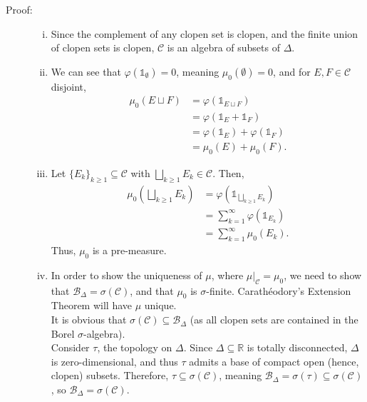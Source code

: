 \documentclass[10pt]{extarticle}
\newcommand{\R}{\mathbb{R}}
\begin{document}
  \begin{description}
    \item[Proof:]\hfill
      \begin{enumerate}[(i)]
        \item Since the complement of any clopen set is clopen, and the finite union of clopen sets is clopen, $\mathcal{C}$ is an algebra of subsets of $\Delta$.
        \item We can see that $\varphi(\mathbb{1}_{\emptyset}) = 0$, meaning $\mu_0(\emptyset) = 0$, and for $E,F\in \mathcal{C}$ disjoint,
          \begin{align*}
            \mu_0(E\sqcup F) &= \varphi(\mathbb{1}_{E\sqcup F})\\
                             &= \varphi(\mathbb{1}_{E} + \mathbb{1}_{F})\\
                             &= \varphi(\mathbb{1}_{E}) + \varphi(\mathbb{1}_{F})\\
                             &= \mu_0(E) + \mu_0(F).
          \end{align*}
        \item Let $\{E_k\}_{k\geq 1}\subseteq \mathcal{C}$ with $\bigsqcup_{k\geq 1}E_k \in \mathcal{C}$. Then,
          \begin{align*}
            \mu_0\left(\bigsqcup_{k\geq 1}E_k\right) &= \varphi\left(\mathbb{1}_{\bigsqcup_{k\geq 1}E_k}\right)\\
                                                     &= \sum_{k = 1}^{\infty}\varphi(\mathbb{1}_{E_k})\\
                                                     &= \sum_{k=1}^{\infty}\mu_0(E_k).
          \end{align*}
          Thus, $\mu_0$ is a pre-measure.
        \item In order to show the uniqueness of $\mu$, where $\mu|_{\mathcal{C}} = \mu_0$, we need to show that $\mathcal{B}_{\Delta} = \sigma(\mathcal{C})$, and that $\mu_0$ is $\sigma$-finite. Carathéodory's Extension Theorem will have $\mu$ unique.\\

          It is obvious that $\sigma(\mathcal{C})\subseteq \mathcal{B}_{\Delta}$ (as all clopen sets are contained in the Borel $\sigma$-algebra).\\

          Consider $\tau$, the topology on $\Delta$. Since $\Delta\subseteq \R$ is totally disconnected, $\Delta$ is zero-dimensional, and thus $\tau$ admits a base of compact open (hence, clopen) subsets. Therefore, $\tau\subseteq \sigma(\mathcal{C})$, meaning $\mathcal{B}_{\Delta} = \sigma(\tau) \subseteq \sigma(\mathcal{C})$, so $\mathcal{B}_{\Delta} = \sigma(\mathcal{C})$.\\


\end{enumerate}
\end{description}
\end{document}
